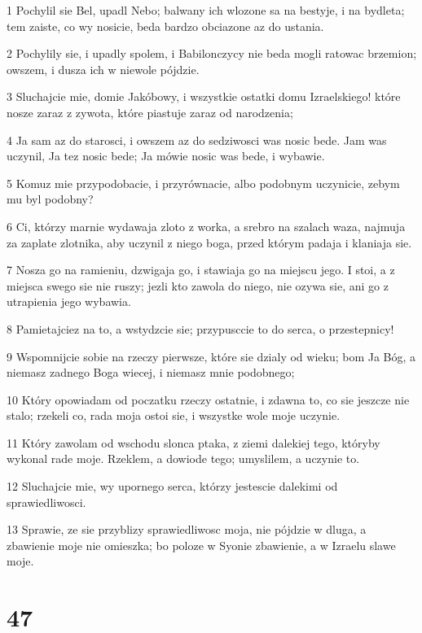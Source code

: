 \par 1 Pochylil sie Bel, upadl Nebo; balwany ich wlozone sa na bestyje, i na bydleta; tem zaiste, co wy nosicie, beda bardzo obciazone az do ustania.
\par 2 Pochylily sie, i upadly spolem, i Babilonczycy nie beda mogli ratowac brzemion; owszem, i dusza ich w niewole pójdzie.
\par 3 Sluchajcie mie, domie Jakóbowy, i wszystkie ostatki domu Izraelskiego! które nosze zaraz z zywota, które piastuje zaraz od narodzenia;
\par 4 Ja sam az do starosci, i owszem az do sedziwosci was nosic bede. Jam was uczynil, Ja tez nosic bede; Ja mówie nosic was bede, i wybawie.
\par 5 Komuz mie przypodobacie, i przyrównacie, albo podobnym uczynicie, zebym mu byl podobny?
\par 6 Ci, którzy marnie wydawaja zloto z worka, a srebro na szalach waza, najmuja za zaplate zlotnika, aby uczynil z niego boga, przed którym padaja i klaniaja sie.
\par 7 Nosza go na ramieniu, dzwigaja go, i stawiaja go na miejscu jego. I stoi, a z miejsca swego sie nie ruszy; jezli kto zawola do niego, nie ozywa sie, ani go z utrapienia jego wybawia.
\par 8 Pamietajciez na to, a wstydzcie sie; przypusccie to do serca, o przestepnicy!
\par 9 Wspomnijcie sobie na rzeczy pierwsze, które sie dzialy od wieku; bom Ja Bóg, a niemasz zadnego Boga wiecej, i niemasz mnie podobnego;
\par 10 Który opowiadam od poczatku rzeczy ostatnie, i zdawna to, co sie jeszcze nie stalo; rzekeli co, rada moja ostoi sie, i wszystke wole moje uczynie.
\par 11 Który zawolam od wschodu slonca ptaka, z ziemi dalekiej tego, któryby wykonal rade moje. Rzeklem, a dowiode tego; umyslilem, a uczynie to.
\par 12 Sluchajcie mie, wy upornego serca, którzy jestescie dalekimi od sprawiedliwosci.
\par 13 Sprawie, ze sie przyblizy sprawiedliwosc moja, nie pójdzie w dluga, a zbawienie moje nie omieszka; bo poloze w Syonie zbawienie, a w Izraelu slawe moje.

\chapter{47}

